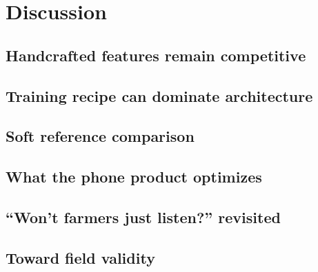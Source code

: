 \section{Discussion}
\label{sec:discussion}

\subsection{Handcrafted features remain competitive}

\subsection{Training recipe can dominate architecture}

\subsection{Soft reference comparison}

\subsection{What the phone product optimizes}

\subsection{``Won't farmers just listen?'' revisited}

\subsection{Toward field validity}
